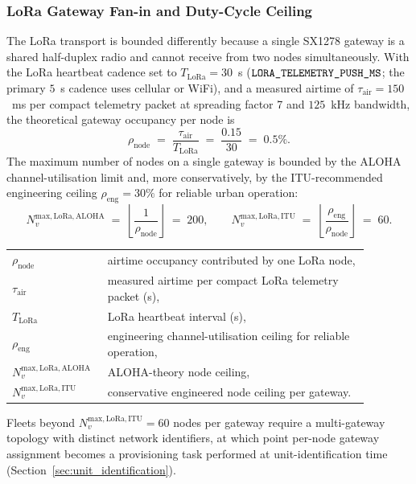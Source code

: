 \subsubsection{LoRa Gateway Fan-in and Duty-Cycle Ceiling}
\label{sec:scale_lora_fanin}

The LoRa transport is bounded differently because a single SX1278 gateway is a shared half-duplex radio and cannot receive from two nodes simultaneously. With the LoRa heartbeat cadence set to $T_{\mathrm{LoRa}} = 30$~s ($\texttt{LORA\_\allowbreak TELEMETRY\_\allowbreak PUSH\_\allowbreak MS}$; the primary $5$~s cadence uses cellular or WiFi), and a measured airtime of $\tau_{\mathrm{air}} = 150$~ms per compact telemetry packet at spreading factor 7 and $125$~kHz bandwidth, the theoretical gateway occupancy per node is
\begin{equation}
\rho_{\mathrm{node}} \;=\; \frac{\tau_{\mathrm{air}}}{T_{\mathrm{LoRa}}} \;=\; \frac{0.15}{30} \;=\; 0.5\%.
\label{eq:scale_lora_occupancy}
\end{equation}
The maximum number of nodes on a single gateway is bounded by the ALOHA channel-utilisation limit and, more conservatively, by the ITU-recommended engineering ceiling $\rho_{\mathrm{eng}} = 30\%$ for reliable urban operation:
\begin{equation}
N_v^{\mathrm{max,LoRa,ALOHA}} \;=\; \left\lfloor \frac{1}{\rho_{\mathrm{node}}} \right\rfloor \;=\; 200,
\qquad
N_v^{\mathrm{max,LoRa,ITU}} \;=\; \left\lfloor \frac{\rho_{\mathrm{eng}}}{\rho_{\mathrm{node}}} \right\rfloor \;=\; 60.
\label{eq:scale_lora_ceiling}
\end{equation}
\noindent\begin{tabular}{@{}p{0.20\linewidth}@{\quad}p{0.68\linewidth}@{}}
$\rho_{\mathrm{node}}$ & airtime occupancy contributed by one LoRa node, \\
$\tau_{\mathrm{air}}$ & measured airtime per compact LoRa telemetry packet (s), \\
$T_{\mathrm{LoRa}}$ & LoRa heartbeat interval (s), \\
$\rho_{\mathrm{eng}}$ & engineering channel-utilisation ceiling for reliable operation, \\
$N_v^{\mathrm{max,LoRa,ALOHA}}$ & ALOHA-theory node ceiling, \\
$N_v^{\mathrm{max,LoRa,ITU}}$ & conservative engineered node ceiling per gateway.
\end{tabular}

\vspace{0.5em}
Fleets beyond $N_v^{\mathrm{max,LoRa,ITU}} = 60$ nodes per gateway require a multi-gateway topology with distinct network identifiers, at which point per-node gateway assignment becomes a provisioning task performed at unit-identification time (Section~\ref{sec:unit_identification}).

